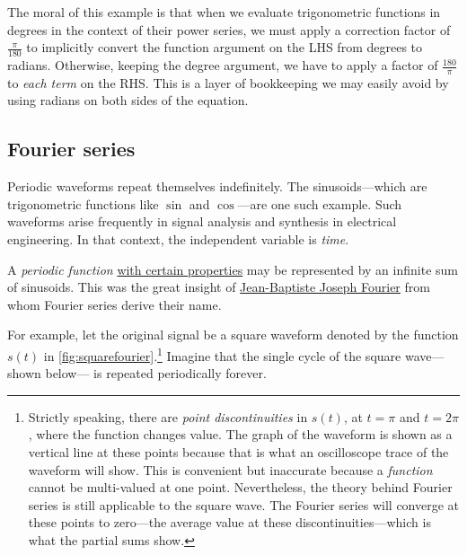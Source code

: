 \documentclass[
  a4paper,
]{article}
\begin{document}
The moral of this example is that when we evaluate trigonometric
functions in degrees in the context of their power series, we must apply
a correction factor of \(\frac{\pi}{180}\) to implicitly convert the
function argument on the LHS from degrees to radians. Otherwise, keeping
the degree argument, we have to apply a factor of \(\frac{180}{\pi}\) to
\emph{each term} on the RHS. This is a layer of bookkeeping we may
easily avoid by using radians on both sides of the equation.

\hypertarget{fourier-series}{%
\subsection{Fourier series}\label{fourier-series}}

Periodic waveforms repeat themselves indefinitely. The sinusoids---which
are trigonometric functions like \(\sin\) and \(\cos\)---are one such
example. Such waveforms arise frequently in signal analysis and
synthesis in electrical engineering. In that context, the independent
variable is \emph{time}.

A \emph{periodic function}
\href{https://eng.libretexts.org/Bookshelves/Electrical_Engineering/Signal_Processing_and_Modeling/Signals_and_Systems_(Baraniuk_et_al.)/06\%3A_Continuous_Time_Fourier_Series_(CTFS)/6.06\%3A_Convergence_of_Fourier_Series}{with
certain properties} may be represented by an infinite sum of sinusoids.
This was the great insight of
\href{https://en.wikipedia.org/wiki/Joseph_Fourier}{Jean-Baptiste Joseph
Fourier} from whom Fourier series derive their name.

For example, let the original signal be a square waveform denoted by the
function \(s(t)\) in \cref{fig:squarefourier}.\footnote{Strictly
  speaking, there are \emph{point discontinuities} in \(s(t)\), at
  \(t=\pi\) and \(t = 2\pi\), where the function changes value. The
  graph of the waveform is shown as a vertical line at these points
  because that is what an oscilloscope trace of the waveform will show.
  This is convenient but inaccurate because a \emph{function} cannot be
  multi-valued at one point. Nevertheless, the theory behind Fourier
  series is still applicable to the square wave. The Fourier series will
  converge at these points to zero---the average value at these
  discontinuities---which is what the partial sums show.} Imagine that
the single cycle of the square wave---shown below--- is repeated
periodically forever.
\end{document}
